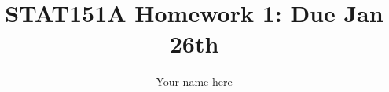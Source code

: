 \documentclass[
  letterpaper,
  DIV=11,
  numbers=noendperiod]{scrartcl}
\title{STAT151A Homework 1: Due Jan 26th}
\author{Your name here}
\date{}
\begin{document}
\maketitle
\ifdefined\Shaded\renewenvironment{Shaded}{\begin{tcolorbox}[frame hidden, borderline west={3pt}{0pt}{shadecolor}, breakable, boxrule=0pt, sharp corners, interior hidden, enhanced]}{\end{tcolorbox}}\fi

\newcommand{\trans}{\intercal}
\newcommand{\norm}[1]{\left\Vert#1\right\Vert}
\newcommand{\abs}[1]{\left|#1\right|}
\newcommand{\bbr}{\mathbb{R}}
\newcommand{\bbz}{\mathbb{Z}}
\newcommand{\bbc}{\mathbb{C}}
\newcommand{\gauss}[1]{\mathcal{N}\left(#1\right)}

\newcommand{\argmin}[1]{\underset{#1}{\mathrm{argmin}}\,}
\newcommand{\projop}[1]{\underset{#1}{\mathrm{Proj}}\,}
\newcommand{\proj}[1]{\underset{#1}{\mybold{P}}}
\newcommand{\expect}[1]{\mathbb{E}\left[#1\right]}
\newcommand{\prob}[1]{\mathbb{P}\left(#1\right)}
\newcommand{\dens}[1]{\mathit{p}\left(#1\right)}
\newcommand{\var}[1]{\mathrm{Var}\left(#1\right)}
\newcommand{\cov}[1]{\mathrm{Cov}\left(#1\right)}
\newcommand{\sumn}{\sum_{n=1}^N}
\newcommand{\meann}{\frac{1}{N} \sumn}

\newcommand{\trace}[1]{\mathrm{trace}\left(#1\right)}
\newcommand{\diag}[1]{\mathrm{Diag}\left(#1\right)}
\newcommand{\grad}[2]{\nabla_{#1} \left. #2 \right.}
\newcommand{\gradat}[3]{\nabla_{#1} \left. #2 \right|_{#3}}
\newcommand{\fracat}[3]{\left. \frac{#1}{#2} \right|_{#3}}

\newcommand{\mybold}[1]{\boldsymbol{#1}}

\newcommand{\W}{\mybold{W}}
\newcommand{\w}{w}
\newcommand{\wbar}{\bar{w}}
\newcommand{\wv}{\mybold{w}}

\newcommand{\X}{\mybold{X}}
\newcommand{\x}{x}
\newcommand{\xbar}{\bar{x}}
\newcommand{\xv}{\mybold{x}}
\newcommand{\Xcov}{\Sigmam_{\X}}

\newcommand{\Z}{\mybold{Z}}
\newcommand{\z}{z}
\newcommand{\zv}{\mybold{z}}
\newcommand{\zbar}{\bar{z}}

\newcommand{\Y}{\mybold{Y}}
\newcommand{\Yhat}{\hat{\Y}}
\newcommand{\y}{y}
\newcommand{\yv}{\mybold{y}}
\newcommand{\yhat}{\hat{\y}}
\newcommand{\ybar}{\bar{y}}

\newcommand{\res}{\varepsilon}
\newcommand{\resv}{\mybold{\res}}
\newcommand{\resvhat}{\hat{\mybold{\res}}}
\newcommand{\reshat}{\hat{\res}}

\newcommand{\betav}{\mybold{\beta}}
\newcommand{\betavhat}{\hat{\bv}}
\newcommand{\betahat}{\hat{\beta}}
\end{document}
